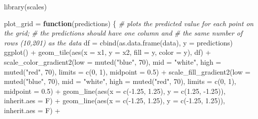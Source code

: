 \documentclass[
]{article}
\newenvironment{Shaded}{\begin{snugshade}}{\end{snugshade}}
\newcommand{\AttributeTok}[1]{\textcolor[rgb]{0.77,0.63,0.00}{#1}}
\newcommand{\CommentTok}[1]{\textcolor[rgb]{0.56,0.35,0.01}{\textit{#1}}}
\newcommand{\ControlFlowTok}[1]{\textcolor[rgb]{0.13,0.29,0.53}{\textbf{#1}}}
\newcommand{\DecValTok}[1]{\textcolor[rgb]{0.00,0.00,0.81}{#1}}
\newcommand{\FloatTok}[1]{\textcolor[rgb]{0.00,0.00,0.81}{#1}}
\newcommand{\FunctionTok}[1]{\textcolor[rgb]{0.00,0.00,0.00}{#1}}
\newcommand{\NormalTok}[1]{#1}
\newcommand{\OtherTok}[1]{\textcolor[rgb]{0.56,0.35,0.01}{#1}}
\newcommand{\SpecialCharTok}[1]{\textcolor[rgb]{0.00,0.00,0.00}{#1}}
\newcommand{\StringTok}[1]{\textcolor[rgb]{0.31,0.60,0.02}{#1}}
\begin{document}
\begin{Shaded}
\begin{Highlighting}[]
\FunctionTok{library}\NormalTok{(scales)}

\NormalTok{plot\_grid }\OtherTok{=} \ControlFlowTok{function}\NormalTok{(predictions) \{}
  \CommentTok{\# plots the predicted value for each point on the grid;}
  \CommentTok{\# the predictions should have one column and}
  \CommentTok{\# the same number of rows (10,201) as the data}
\NormalTok{  df }\OtherTok{=} \FunctionTok{cbind}\NormalTok{(}\FunctionTok{as.data.frame}\NormalTok{(data), }\AttributeTok{y =}\NormalTok{ predictions)}
  \FunctionTok{ggplot}\NormalTok{() }\SpecialCharTok{+}
    \FunctionTok{geom\_tile}\NormalTok{(}\FunctionTok{aes}\NormalTok{(}\AttributeTok{x =}\NormalTok{ x1, }\AttributeTok{y =}\NormalTok{ x2, }\AttributeTok{fill =}\NormalTok{ y, }\AttributeTok{color =}\NormalTok{ y), df) }\SpecialCharTok{+}
    \FunctionTok{scale\_color\_gradient2}\NormalTok{(}\AttributeTok{low =} \FunctionTok{muted}\NormalTok{(}\StringTok{"blue"}\NormalTok{, }\DecValTok{70}\NormalTok{), }\AttributeTok{mid =} \StringTok{"white"}\NormalTok{,}
                         \AttributeTok{high =} \FunctionTok{muted}\NormalTok{(}\StringTok{"red"}\NormalTok{, }\DecValTok{70}\NormalTok{), }\AttributeTok{limits =} \FunctionTok{c}\NormalTok{(}\DecValTok{0}\NormalTok{, }\DecValTok{1}\NormalTok{),}
                         \AttributeTok{midpoint =} \FloatTok{0.5}\NormalTok{) }\SpecialCharTok{+}
    \FunctionTok{scale\_fill\_gradient2}\NormalTok{(}\AttributeTok{low =} \FunctionTok{muted}\NormalTok{(}\StringTok{"blue"}\NormalTok{, }\DecValTok{70}\NormalTok{), }\AttributeTok{mid =} \StringTok{"white"}\NormalTok{,}
                        \AttributeTok{high =} \FunctionTok{muted}\NormalTok{(}\StringTok{"red"}\NormalTok{, }\DecValTok{70}\NormalTok{), }\AttributeTok{limits =} \FunctionTok{c}\NormalTok{(}\DecValTok{0}\NormalTok{, }\DecValTok{1}\NormalTok{),}
                        \AttributeTok{midpoint =} \FloatTok{0.5}\NormalTok{) }\SpecialCharTok{+}
    \FunctionTok{geom\_line}\NormalTok{(}\FunctionTok{aes}\NormalTok{(}\AttributeTok{x =} \FunctionTok{c}\NormalTok{(}\SpecialCharTok{{-}}\FloatTok{1.25}\NormalTok{, }\FloatTok{1.25}\NormalTok{), }\AttributeTok{y =} \FunctionTok{c}\NormalTok{(}\FloatTok{1.25}\NormalTok{, }\SpecialCharTok{{-}}\FloatTok{1.25}\NormalTok{)), }\AttributeTok{inherit.aes =}\NormalTok{ F) }\SpecialCharTok{+}
    \FunctionTok{geom\_line}\NormalTok{(}\FunctionTok{aes}\NormalTok{(}\AttributeTok{x =} \FunctionTok{c}\NormalTok{(}\SpecialCharTok{{-}}\FloatTok{1.25}\NormalTok{, }\FloatTok{1.25}\NormalTok{), }\AttributeTok{y =} \FunctionTok{c}\NormalTok{(}\SpecialCharTok{{-}}\FloatTok{1.25}\NormalTok{, }\FloatTok{1.25}\NormalTok{)), }\AttributeTok{inherit.aes =}\NormalTok{ F) }\SpecialCharTok{+}

\end{Highlighting}
\end{Shaded}
\end{document}
